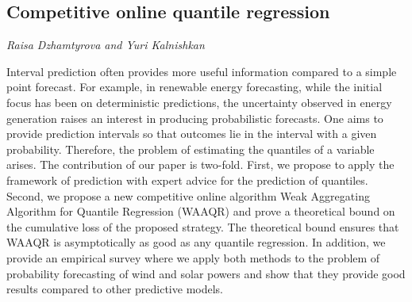\documentclass[../booklet.tex]{subfiles}
\begin{document}
\subsection[Competitive online quantile regression. {\it Raisa Dzhamtyrova and Yuri Kalnishkan}]{Competitive online quantile regression}
 

\begin{center}
  {\it Raisa Dzhamtyrova and Yuri Kalnishkan}
\end{center}



 Interval prediction often provides more useful information compared to a simple point forecast. For example, in renewable energy forecasting, while the initial focus has been on deterministic predictions, the uncertainty observed in energy generation raises an interest in producing probabilistic forecasts. One aims to provide prediction intervals so that outcomes lie in the interval with a given probability. Therefore, the problem of estimating the quantiles of a variable arises. The contribution of our paper is two-fold. First, we propose to apply the framework of prediction with expert advice for the prediction of quantiles. Second, we propose a new competitive online algorithm Weak Aggregating Algorithm for Quantile Regression (WAAQR) and prove a theoretical bound on the cumulative loss of the proposed strategy. The theoretical bound ensures that WAAQR is asymptotically as good as any quantile regression. In addition, we provide an empirical survey where we apply both methods to the problem of probability forecasting of wind and solar powers and show that they provide good results compared to other predictive models.

\end{document}
